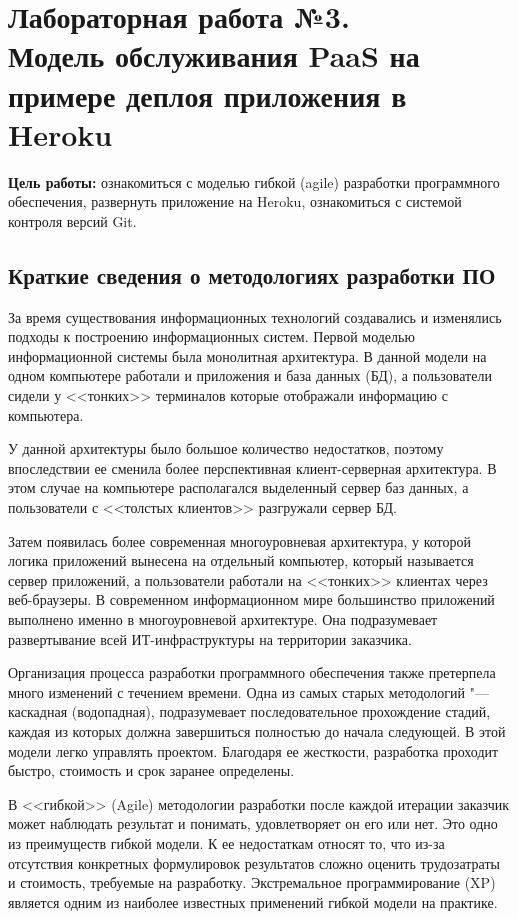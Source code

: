 \section[ЛР №3. Модель обслуживания PaaS, Heroku]{Лабораторная работа №3. \\
Модель обслуживания PaaS на примере деплоя приложения в Heroku}

\textbf{Цель работы:} ознакомиться с моделью гибкой (agile) разработки программного обеспечения, развернуть приложение на Heroku, ознакомиться с системой контроля версий Git.

\subsection{Краткие сведения о методологиях разработки ПО}
За время существования информационных технологий создавались и изменялись подходы к построению информационных систем.
Первой моделью информационной системы была монолитная архитектура.
В данной модели на одном компьютере работали и приложения и база данных (БД), а пользователи сидели у <<тонких>> терминалов которые отображали информацию с компьютера.

У данной архитектуры было большое количество недостатков, поэтому впоследствии ее сменила более перспективная клиент-серверная архитектура.
В этом случае на компьютере располагался выделенный сервер баз данных, а пользователи с <<толстых клиентов>> разгружали сервер БД.

Затем появилась более современная многоуровневая архитектура, у которой логика приложений вынесена на отдельный компьютер, который называется сервер приложений, а пользователи работали на <<тонких>> клиентах через веб-браузеры.
В современном информационном мире большинство приложений выполнено именно в многоуровневой архитектуре.
Она подразумевает развертывание всей ИТ-инфраструктуры на территории заказчика.

Организация процесса разработки программного обеспечения также претерпела много изменений с течением времени.
Одна из самых старых методологий "--- каскадная (водопадная), подразумевает последовательное прохождение стадий, каждая из которых должна завершиться полностью до начала следующей.
В этой модели легко управлять проектом.
Благодаря ее жесткости, разработка проходит быстро, стоимость и срок заранее определены.

В <<гибкой>> (Agile) методологии разработки после каждой итерации заказчик может наблюдать результат и понимать, удовлетворяет он его или нет.
Это одно из преимуществ гибкой модели.
К ее недостаткам относят то, что из-за отсутствия конкретных формулировок результатов сложно оценить трудозатраты и стоимость, требуемые на разработку.
Экстремальное программирование (XP) является одним из наиболее известных применений гибкой модели на практике.

